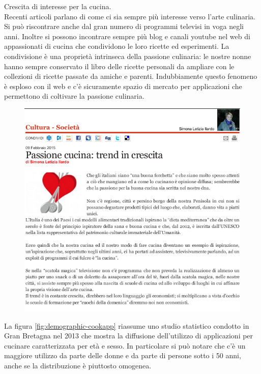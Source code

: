 \begin{itemize}
\begin{minipage}{0.45\textwidth}
\item
Crescita di interesse per la cucina.\\
Recenti articoli parlano di come
ci sia sempre più interesse verso l'arte culinaria. 
Si può riscontrare anche dal gran numero di programmi televisi in voga
negli anni. Inoltre si possono incontrare sempre più blog e canali
youtube nel web di appassionati di cucina che condividono le loro
ricette ed esperimenti.
La condivisione è una proprietà intrinseca della passione culinaria: le
nostre nonne hanno sempre conservato il libro delle ricette personali da
ampliare con le collezioni di ricette passate da amiche e parenti.
Indubbiamente questo fenomeno è esploso con il web e c'è sicuramente
spazio di mercato per applicazioni che permettono di coltivare la
passione culinaria.
\end{minipage}
\begin{minipage}{0.45\textwidth}
\begin{figure} [H]
	\centering
	\includegraphics[scale=0.3]{img/articolo-cucina.png}
\end{figure}
\end{minipage}

La figura \ref{fig:demographic-cookapp} riassume uno studio statistico
condotto in Gran Bretagna nel 2013 che mostra la diffusione
dell'utilizzo di applicazioni per cucinare caratterizzata per età e
sesso. In particolare si può notare che c'è un maggiore utilizzo da
parte delle donne e da parte di persone sotto i 50 anni, anche se la
distribuzione è piuttosto omogenea.


\end{itemize}
